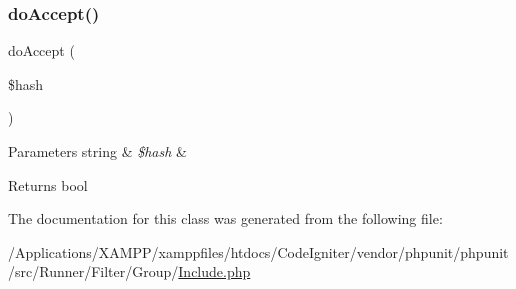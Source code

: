 \subsubsection{\texorpdfstring{do\+Accept()}{doAccept()}}
{\footnotesize\ttfamily do\+Accept (\begin{DoxyParamCaption}\item[{}]{\$hash }\end{DoxyParamCaption})\hspace{0.3cm}{\ttfamily [protected]}}


\begin{DoxyParams}[1]{Parameters}
string & {\em \$hash} & \\
\hline
\end{DoxyParams}
\begin{DoxyReturn}{Returns}
bool 
\end{DoxyReturn}


The documentation for this class was generated from the following file\+:\begin{DoxyCompactItemize}
\item 
/\+Applications/\+X\+A\+M\+P\+P/xamppfiles/htdocs/\+Code\+Igniter/vendor/phpunit/phpunit/src/\+Runner/\+Filter/\+Group/\mbox{\hyperlink{_include_8php}{Include.\+php}}\end{DoxyCompactItemize}
